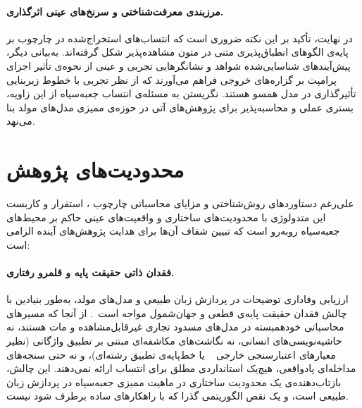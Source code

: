 \paragraph{مرزبندی معرفت‌شناختی و سرنخ‌های عینی اثرگذاری.}
در نهایت، تأکید بر این نکته ضروری است که انتساب‌های استخراج‌شده در چارچوب  بر پایه‌ی الگوهای انطباق‌پذیری متنی در متون مشاهده‌پذیر شکل گرفته‌اند. به‌بیانی دیگر، پیش‌آیندهای شناسایی‌شده شواهد و نشانگرهایی تجربی و عینی از نحوه‌ی تأثیر اجزای پرامپت بر گزاره‌های خروجی فراهم می‌آورند که از نظر تجربی با خطوط زیربنایی تأثیرگذاری در مدل همسو هستند. نگریستن به مسئله‌ی انتساب جعبه‌سیاه از این زاویه، بستری عملی و محاسبه‌پذیر برای پژوهش‌های آتی در حوزه‌ی ممیزی مدل‌های مولد بنا می‌نهد.


\section{محدودیت‌های پژوهش}\label{sec:6-2}

علی‌رغم دستاوردهای روش‌شناختی و مزایای محاسباتی چارچوب ، استقرار و کاربست این متدولوژی با محدودیت‌های ساختاری و واقعیت‌های عینی حاکم بر محیط‌های جعبه‌سیاه روبه‌رو است که تبیین شفاف آن‌ها برای هدایت پژوهش‌های آینده الزامی است:

\paragraph{فقدان ذاتی حقیقت پایه و قلمرو رفتاری.}
ارزیابی وفاداری توضیحات در پردازش زبان طبیعی و مدل‌های مولد، به‌طور بنیادین با چالش فقدان حقیقت پایه‌ی قطعی و جهان‌شمول مواجه است~\cite{schneider2024explainable, moran2026towardinterpretable}. از آنجا که مسیرهای محاسباتی خودهمبسته در مدل‌های مسدود تجاری غیرقابل‌مشاهده و مات هستند، نه حاشیه‌نویسی‌های انسانی، نه نگاشت‌های مکاشفه‌ای مبتنی بر تطبیق واژگانی (نظیر معیارهای اعتبارسنجی خارجی ~\cite{rashkin2023measuring} یا خط‌پایه‌ی تطبیق رشته‌ای)، و نه حتی سنجه‌های مداخله‌ای پادواقعی، هیچ‌یک استانداردی مطلق برای انتساب ارائه نمی‌دهند. این چالش، بازتاب‌دهنده‌ی یک محدودیت ساختاری در ماهیت ممیزی جعبه‌سیاه در پردازش زبان طبیعی است، و یک نقص الگوریتمی گذرا که با راهکارهای ساده برطرف شود نیست.

